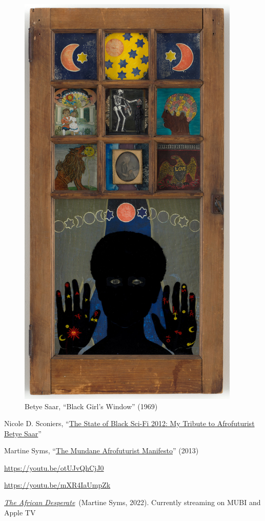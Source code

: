 \documentclass[
  letterpaper,
  DIV=11,
  numbers=noendperiod]{scrartcl}
\begin{document}
\begin{figure}

\includegraphics[width=4.16667in,height=\textheight]{../img/betye-saar.jpg} \hfill{}

\caption{Betye Saar, ``Black Girl's Window'' (1969)}

\end{figure}

Nicole D. Sconiers,
``\href{http://nicolesconiers.com/blog/2012/02/20/the-state-of-black-sci-fi-2012-my-tribute-to-afrofuturist-betye-saar/}{The
State of Black Sci-Fi 2012: My Tribute to Afrofuturist Betye Saar}''

Martine Syms,
``\href{http://thirdrailquarterly.org/martine-syms-the-mundane-afrofuturist-manifesto/}{The
Mundane Afrofuturist Manifesto}'' (2013)

\url{https://youtu.be/otUJvQhCjJ0}

\url{https://youtu.be/mXR4IaUmpZk}

\href{https://mubi.com/films/the-african-desperate}{\emph{The African
Desperate}}~(Martine Syms, 2022). Currently streaming on MUBI and Apple
TV
\end{document}
